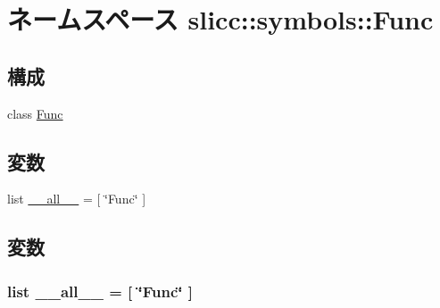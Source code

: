 \hypertarget{namespaceslicc_1_1symbols_1_1Func}{
\section{ネームスペース slicc::symbols::Func}
\label{namespaceslicc_1_1symbols_1_1Func}
}
\subsection*{構成}
\begin{DoxyCompactItemize}
\item 
class \hyperlink{classslicc_1_1symbols_1_1Func_1_1Func}{Func}
\end{DoxyCompactItemize}
\subsection*{変数}
\begin{DoxyCompactItemize}
\item 
list \hyperlink{namespaceslicc_1_1symbols_1_1Func_aa4a022e6ddacd362b83964da5cc5d044}{\_\-\_\-all\_\-\_\-} = \mbox{[} \char`\"{}Func\char`\"{} \mbox{]}
\end{DoxyCompactItemize}


\subsection{変数}
\hypertarget{namespaceslicc_1_1symbols_1_1Func_aa4a022e6ddacd362b83964da5cc5d044}{
\subsubsection[{\_\-\_\-all\_\-\_\-}]{\setlength{\rightskip}{0pt plus 5cm}list {\bf \_\-\_\-all\_\-\_\-} = \mbox{[} \char`\"{}Func\char`\"{} \mbox{]}}}
\label{namespaceslicc_1_1symbols_1_1Func_aa4a022e6ddacd362b83964da5cc5d044}
